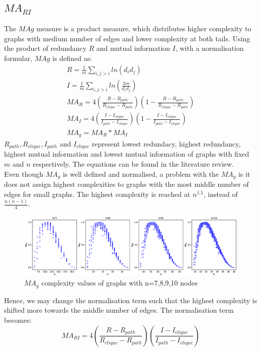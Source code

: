 \documentclass[12pt]{article}
\begin{document}
\subsection{$MA_{RI}$}
The $MAg$ measure is a product measure, which distributes higher complexity to graphs with medium number of edges and lower complexity at both tails. Using the product of redundancy $R$ and mutual information $I$, with a normalisation formular, $MAg$ is defined as\cite{KIM20082637}:
\begin{equation}
    \label{eq:MAg}
    \begin{gathered}
        R = \frac{1}{m}\sum_{i,j>i}ln(d_id_j)\\
        I = \frac{1}{m}\sum_{i,j>i}ln(\frac{2m}{d_id_j})\\
        MA_R = 4(\frac{R-R_{path}}{R_{clique}-R_{path}})(1-\frac{R-R_{path}}{R_{clique}-R_{path}})\\
        MA_I = 4(\frac{I-I_{clique}}{I_{path}-I_{clique}})(1-\frac{I-I_{clique}}{I_{path}-I_{clique}})\\
        MA_g = MA_R * MA_I
    \end{gathered}
\end{equation}
$R_{path},R_{clique},I_{path}$ and $I_{clique}$ represent lowest redundacy, highest redundancy, highest mutual information and lowest mutual information of graphs with fixed $m$ and $n$ respectively. The equations can be found in the literature review.\\
Even though $MA_g$ is well defined and normalised, a problem with the $MA_g$ is it does not assign highest complexities to graphs with the most middle number of edges for small graphs. The highest complexity is reached at $n^{1.5}$, instead of $\frac{n(n-1)}{4}$.\\

\begin{figure}[ht]
    \includegraphics[width=\textwidth]{mag.eps}
    \centering
    \caption{$MA_g$ complexity values of graphs with n=7,8,9,10 nodes}
    \label{fig:mag}
\end{figure}
\noindent
Hence, we may change the normalisation term such that the highest complexity is shifted more towards the middle number of edges. The normalisation term becomes:
\begin{equation}
    \label{eq:mari}
    MA_{RI} = 4(\frac{R-R_{path}}{R_{clique}-R_{path}})(\frac{I-I_{clique}}{I_{path}-I_{clique}})
\end{equation}
\end{document}
